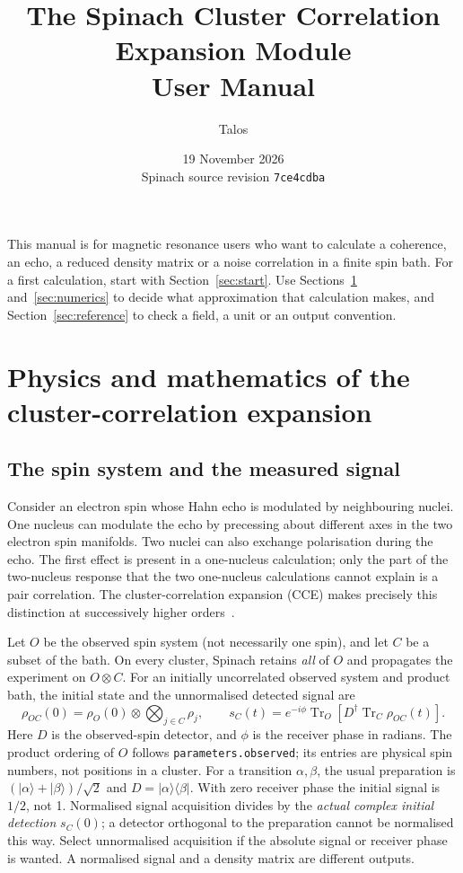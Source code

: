 \documentclass[11pt,a4paper]{article}
\title{\textbf{The Spinach Cluster Correlation Expansion Module}\\[2mm]
       \Large User Manual}
\author{Talos}
\date{19 November 2026 \\[1mm] \normalsize Spinach source revision \texttt{7ce4cdba}}
\newcommand{\code}[1]{\texttt{#1}}
\newcommand{\Tr}{\operatorname{Tr}}
\begin{document}
\maketitle
\noindent This manual is for magnetic resonance users who want to calculate a coherence, an echo, a reduced density matrix or a noise correlation in a finite spin bath. For a first calculation, start with Section~\ref{sec:start}. Use Sections~\ref{sec:physics} and~\ref{sec:numerics} to decide what approximation that calculation makes, and Section~\ref{sec:reference} to check a field, a unit or an output convention.
\tableofcontents
\clearpage
\section{Physics and mathematics of the cluster-correlation expansion}
\label{sec:physics}

\subsection{The spin system and the measured signal}

Consider an electron spin whose Hahn echo is modulated by neighbouring
nuclei. One nucleus can modulate the echo by precessing about different
axes in the two electron spin manifolds. Two nuclei can also exchange
polarisation during the echo. The first effect is present in a one-nucleus
calculation; only the part of the two-nucleus response that the two
one-nucleus calculations cannot explain is a pair correlation. The
cluster-correlation expansion (CCE) makes precisely this distinction at
successively higher orders~\cite{cce-theory-yang08}.

Let $O$ be the observed spin system (not necessarily one spin), and let
$C$ be a subset of the bath. On every cluster, Spinach retains \emph{all}
of $O$ and propagates the experiment on $O\otimes C$. For an initially
uncorrelated observed system and product bath, the initial state and the
unnormalised detected signal are
\begin{equation}
  \rho_{OC}(0)=\rho_O(0)\otimes\!\bigotimes_{j\in C}\rho_j,\qquad
  s_C(t)=e^{-i\phi}\Tr_O\!\left[D^\dagger\Tr_C\rho_{OC}(t)\right].
  \label{eq:cce-theory-receiver}
\end{equation}
Here $D$ is the observed-spin detector, and $\phi$ is the receiver phase
in radians. The product ordering of $O$ follows \code{parameters.observed};
its entries are physical spin numbers, not positions in a cluster. For a
transition $\alpha,\beta$, the usual preparation is
$(|\alpha\rangle+|\beta\rangle)/\sqrt{2}$ and
$D=|\alpha\rangle\langle\beta|$. With zero receiver phase the initial
signal is $1/2$, not 1. Normalised signal acquisition divides by the
\emph{actual complex initial detection} $s_C(0)$; a detector orthogonal
to the preparation cannot be normalised this way. Select unnormalised
acquisition if the absolute signal or receiver phase is wanted. A
normalised signal and a density matrix are different outputs.
\end{document}
